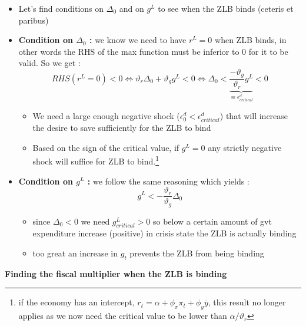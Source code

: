 \documentclass{article}
\begin{document}
\begin{itemize}
    \item Let's find conditions on $\Delta_0$ and on $g^L$ to see when the ZLB binds (ceteris et paribus)
    \item \textbf{Condition on $\Delta_0$ :} we know we need to have $r^L=0$ when ZLB binds, in other words the RHS of the max function must be inferior to 0 for it to be valid. So we get :
    \begin{equation}
        RHS(r^L=0) < 0 \Longleftrightarrow \vartheta_r\Delta_0 + \vartheta_gg^L < 0 \Longleftrightarrow {\Delta_0 < \underbrace{\frac{-\vartheta_g}{\vartheta_r}g^L}_{\equiv\epsilon_{critical}^d}} <0
    \end{equation}
    \begin{takebox}
    \begin{itemize}
        \item We need a large enough negative shock ($\epsilon_0^d<\epsilon_{critical}^d$) that will increase the desire to save sufficiently for the ZLB to bind 
        \item Based on the sign of the critical value, if $g^L=0$ any strictly negative shock will suffice for ZLB to bind.\footnote{if the economy has an intercept, $r_t = \alpha + \phi_\pi\pi_t+\phi_y\bar{y}$, this result no longer applies as we now need the critical value to be lower than $\alpha/\vartheta_r$}
    \end{itemize}
    \end{takebox}
    \item \textbf{Condition on $g^L$ :} we follow the same reasoning which yields :
    \begin{equation}
        g^L < -\frac{\vartheta_r}{\vartheta_g}\Delta_0
    \end{equation}
    \begin{takebox}
    \begin{itemize}
        \item since $\Delta_0<0$ we need $g_{critical}^L>0$ so below a certain amount of gvt expenditure increase (positive) in crisis state the ZLB is actually binding
        \item too great an increase in $g_t$ prevents the ZLB from being binding
    \end{itemize}
    \end{takebox}
\end{itemize}
\textbf{Finding the fiscal multiplier when the ZLB is binding}
\end{document}
